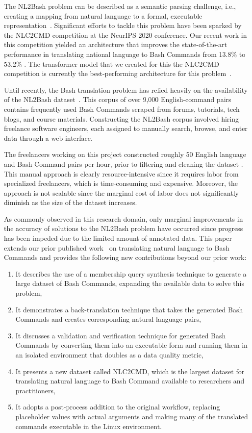 \documentclass{river-journal}
\begin{document}
The NL2Bash problem can be described as a semantic parsing challenge, i.e., creating a mapping from natural language to a formal, executable representation~\cite{mooney2014semantic}. Significant efforts to tackle this problem have been sparked by the NLC2CMD competition at the NeurIPS 2020 conference. Our recent work in this competition yielded an architecture that improves the state-of-the-art performance in translating national language to Bash Commands from 13.8\% to 53.2\% \cite{fu2021transformer}. The transformer model that we created for this the NLC2CMD competition is currently the best-performing architecture for this problem~\cite{bharadwaj2021explainable}.

Until recently, the Bash translation problem has relied heavily on the availability of the NL2Bash dataset~\cite{lin2018nl2Bash}. This corpus of over 9,000 English-command pairs contains frequently used Bash Commands scraped from forums, tutorials, tech blogs, and course materials. Constructing the NL2Bash corpus involved hiring freelance software engineers, each assigned to manually search, browse, and enter data through a web interface. 

The freelancers working on this project constructed roughly 50 English language and Bash Command pairs per hour, prior to filtering and cleaning the dataset  \cite{lin2018nl2Bash}. This manual approach is clearly resource-intensive since it requires labor from specialized freelancers, which is time-consuming and expensive. Moreover, the approach is not scalable since the marginal cost of labor does not significantly diminish as the size of the dataset increases.

As commonly observed in this research domain, only marginal improvements in the accuracy of solutions to the NL2Bash problem have occurred since progress has been impeded due to the limited amount of annotated data. This paper extends our prior published work~\cite{9680023} on translating natural language to Bash Commands and provides the following new contributions beyond our prior work:
\begin{enumerate}
    \item It describes the use of a membership query synthesis technique to generate a large dataset of Bash Commands, expanding the available data to solve this problem,
    \item It demonstrates a back-translation technique that takes the generated Bash Commands and creates corresponding natural language pairs,
    \item It discusses a validation and verification technique for generated Bash Commands by converting them into an executable form and running them in an isolated environment that doubles as a data quality metric,
    \item It presents a new dataset called NLC2CMD, which is the largest dataset for translating natural language to Bash Command available to researchers and practitioners,
    \item It adopts a post-process addition to the original workflow, replacing placeholder values with actual arguments and making many of the translated commands executable in the Linux environment.
\end{enumerate}
\end{document}
